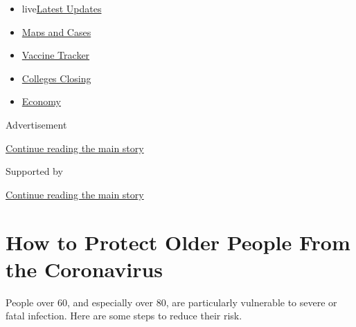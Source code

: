 \begin{itemize}
\tightlist
\item
  live\href{https://www.nytimes3xbfgragh.onion/2020/08/21/world/covid-19-coronavirus.html?name=styln-coronavirus-national\&region=TOP_BANNER\&variant=undefined\&block=storyline_menu_recirc\&action=click\&pgtype=Article\&impression_id=2c183b41-e3b6-11ea-befc-036b724b9a9b}{Latest
  Updates}
\item
  \href{https://www.nytimes3xbfgragh.onion/interactive/2020/us/coronavirus-us-cases.html?name=styln-coronavirus-national\&region=TOP_BANNER\&variant=undefined\&block=storyline_menu_recirc\&action=click\&pgtype=Article\&impression_id=2c186250-e3b6-11ea-befc-036b724b9a9b}{Maps
  and Cases}
\item
  \href{https://www.nytimes3xbfgragh.onion/interactive/2020/science/coronavirus-vaccine-tracker.html?name=styln-coronavirus-national\&region=TOP_BANNER\&variant=undefined\&block=storyline_menu_recirc\&action=click\&pgtype=Article\&impression_id=2c186251-e3b6-11ea-befc-036b724b9a9b}{Vaccine
  Tracker}
\item
  \href{https://www.nytimes3xbfgragh.onion/2020/08/19/us/colleges-closing-covid.html?name=styln-coronavirus-national\&region=TOP_BANNER\&variant=undefined\&block=storyline_menu_recirc\&action=click\&pgtype=Article\&impression_id=2c186252-e3b6-11ea-befc-036b724b9a9b}{Colleges
  Closing}
\item
  \href{https://www.nytimes3xbfgragh.onion/live/2020/08/21/business/stock-market-today-coronavirus?name=styln-coronavirus-national\&region=TOP_BANNER\&variant=undefined\&block=storyline_menu_recirc\&action=click\&pgtype=Article\&impression_id=2c186253-e3b6-11ea-befc-036b724b9a9b}{Economy}
\end{itemize}

Advertisement

\protect\hyperlink{after-top}{Continue reading the main story}

Supported by

\protect\hyperlink{after-sponsor}{Continue reading the main story}

\hypertarget{how-to-protect-older-people-from-the-coronavirus}{%
\section{How to Protect Older People From the
Coronavirus}\label{how-to-protect-older-people-from-the-coronavirus}}

People over 60, and especially over 80, are particularly vulnerable to
severe or fatal infection. Here are some steps to reduce their risk.

